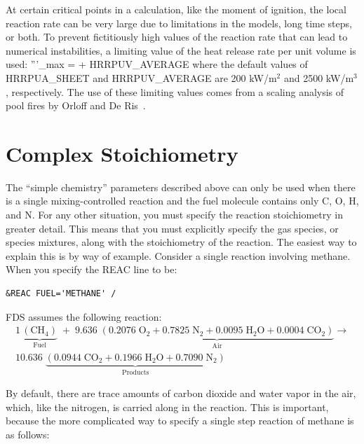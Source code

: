 \documentclass[11pt]{book}
\begin{document}
At certain critical points in a calculation, like the moment of ignition, the local reaction rate can be very large due to limitations in the models, long time
steps, or both. To prevent fictitiously high values of the reaction rate that can lead to numerical instabilities, a limiting value of the heat release rate
per unit volume is used:
\be
   \dq'''_{\hbox{\tiny max}} =  + \hbox{\ct HRRPUV\_AVERAGE}
\ee
where the default values of {\ct HRRPUA\_SHEET} and {\ct HRRPUV\_AVERAGE} are 200 kW/m$^2$ and 2500 kW/m$^3$, respectively. The use of these limiting values comes from a scaling analysis of pool fires by Orloff and De Ris~\cite{Orloff:19th_Symposium}.




\clearpage

\section{Complex Stoichiometry}
\label{info:REAC_Diagnostics}

The ``simple chemistry'' parameters described above can only be used when there is a single mixing-controlled reaction and the fuel molecule contains only C, O, H, and N.
For any other situation, you must specify the reaction stoichiometry in greater detail. This means that you must explicitly specify the gas species, or species mixtures, along with
the stoichiometry of the reaction. The easiest way to explain this is by way of example. Consider a single reaction involving methane. When you specify the {\ct REAC} line to be:

\begin{lstlisting}
&REAC FUEL='METHANE' /
\end{lstlisting}

\noindent FDS assumes the following reaction:
\begin{multline}
1\,\underbrace{\mathrm{ (CH_4) }}_\text{Fuel} \; + \;
9.636 \; \underbrace{ \mathrm{\left( 0.2076 \; O_2 + 0.7825 \; N_2 + 0.0095 \; H_2O + 0.0004 \; CO_2 \right)}}_\text{Air} \longrightarrow \\
10.636 \; \underbrace{\mathrm{(0.0944 \; CO_2 +  0.1966 \; H_2O + 0.7090 \; N_2)}}_\text{Products}
\end{multline}

\noindent By default, there are trace amounts of carbon dioxide and water vapor in the air, which, like the nitrogen, is carried along in the reaction. This is important, because the more complicated way to specify a single step reaction of methane is as follows:
\end{document}
